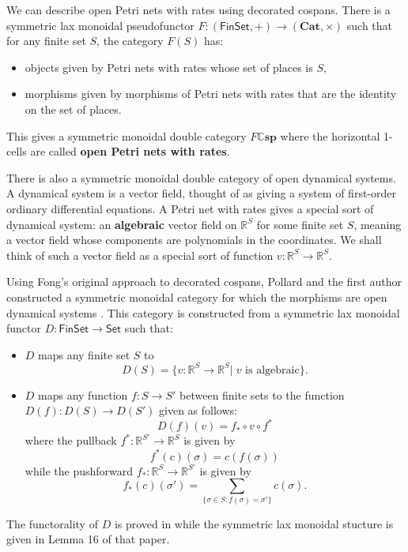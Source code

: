 \documentclass[ a4paper, onecolumn, superscriptaddress,10pt, accepted=2022-02-14, issue=3, volume=4, shorttitle=papers/compositionality-4-3 ]{compositionalityarticle}
\newcommand{\R}{\mathbb{R}}
\let\maps\colon
\newcommand{\Set}{\mathsf{Set}}
\newcommand{\Fin}{\mathsf{Fin}}
\newcommand{\bicat}{\mathbf}
\newcommand{\Cat}{\bicat{Cat}}
\newcommand{\double}[1]{\mathbf{\mathbb #1}}
\newcommand{\lCsp}{\double{Csp}}
\newcommand{\define}[1]{{\rm \textbf{#1}}}
\begin{document}
We can describe open Petri nets with rates using decorated cospans.  There is a symmetric lax monoidal pseudofunctor $F \maps (\Fin\Set, +) \to (\Cat, \times)$ such that for any finite set $S$, the category $F(S)$ has:
\begin{itemize}
\item objects given by Petri nets with rates whose set of places is $S$,
\item morphisms given by morphisms of Petri nets with rates that are the identity on the set of places.
\end{itemize}
This gives a symmetric monoidal double category $F \lCsp$ where the horizontal 1-cells are called \define{open Petri nets with rates}.

There is also a symmetric monoidal double category of open dynamical systems.   A dynamical system is a vector field, thought of as giving a system of first-order ordinary differential equations.  A Petri net with rates gives a special sort of dynamical system: an \define{algebraic} vector field on $\R^S$ for some finite set $S$, meaning a vector field whose components are polynomials in the coordinates. We shall think of such a vector field as a special sort of function $v \maps \R^S \to \R^S$.

Using Fong's original approach to decorated cospans, Pollard and the first author constructed a symmetric monoidal category for which the morphisms are open dynamical systems \cite[Theorem 17]{BP}.  This category is constructed from a symmetric lax monoidal functor
$D \maps \Fin\Set \to \Set$ such that:
\begin{itemize}
\item $D$ maps any finite set $S$ to
\[ D(S) = \{ v \maps \R^S \to \R^S | \; v \textrm{ is algebraic}  \}. \]
\item $D$ maps any function $f \maps S \to S'$ between finite sets to the function $D(f) \maps D(S) \to D(S')$ given as follows:
\[ D(f)(v) = f_* \circ v \circ f^* \]
where the pullback $ f^* \maps \R^{S'} \to \R^S $ is given by
\[ f^*(c)(\sigma) = c(f(\sigma)) \]
while the pushforward $ f_* \maps \R^{S} \to \R^{S'} $ is given by
\[ f_*(c)(\sigma') = \sum_{ \{ \sigma \in S : f(\sigma) = \sigma' \} } c(\sigma). \]
\end{itemize}
The functorality of $D$ is proved in \cite[Lemma 15]{BP} while the symmetric lax monoidal stucture is given in Lemma 16 of that paper.
\end{document}
